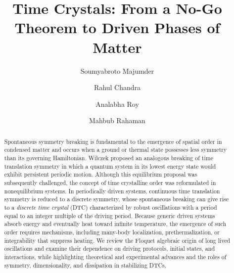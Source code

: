 \documentclass[%
reprint,
superscriptaddress,
amsmath,amssymb,
aps,
prb,
showkeys,%
floatfix,
]{revtex4-2}
\begin{document}
	
	\title{Time Crystals: From a No-Go Theorem to Driven Phases of Matter}
	
	\author{Soumyabroto Majumder}
	
	\author{Rahul Chandra}
	
	\author{Analabha Roy}
	
	\author{Mahbub Rahaman}
	
	\begin{abstract}
		Spontaneous symmetry breaking is fundamental to the emergence of spatial order in condensed matter and occurs when a ground or thermal state possesses less symmetry than its governing Hamiltonian. Wilczek proposed an analogous breaking of time translation symmetry in which a quantum system in its lowest energy state would exhibit persistent periodic motion. Although this equilibrium proposal was subsequently challenged, the concept of time crystalline order was reformulated in nonequilibrium systems. In periodically driven systems, continuous time translation symmetry is reduced to a discrete symmetry, whose spontaneous breaking can give rise to a \emph{discrete time crystal} (DTC) characterized by robust oscillations with a period equal to an integer multiple of the driving period. Because generic driven systems absorb energy and eventually heat toward infinite temperature, the emergence of such order requires mechanisms, including many-body localization, prethermalization, or integrability that suppress heating. We review the Floquet algebraic origin of long lived oscillations and examine their dependence on driving protocols, initial states, and interactions, while highlighting theoretical and experimental advances and the roles of symmetry, dimensionality, and dissipation in stabilizing DTCs.
	\end{abstract}
	
	\maketitle
	
\end{document}
